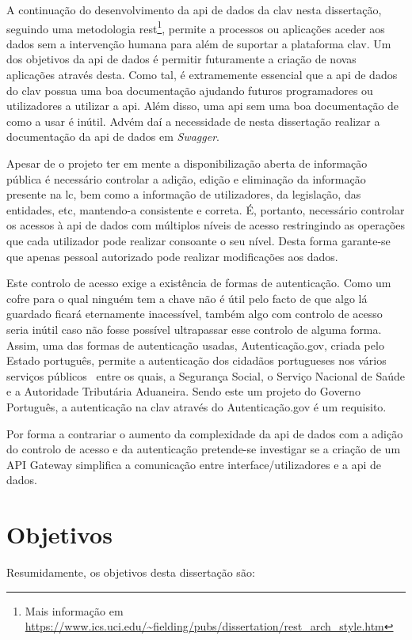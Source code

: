 A continuação do desenvolvimento da \acrshort{api} de dados da \acrshort{clav} nesta dissertação, seguindo uma metodologia \acrshort{rest}\footnote{Mais informação em \url{https://www.ics.uci.edu/~fielding/pubs/dissertation/rest_arch_style.htm}}, permite a processos ou aplicações aceder aos dados sem a intervenção humana para além de suportar a plataforma \acrshort{clav}. Um dos objetivos da \acrshort{api} de dados é permitir futuramente a criação de novas aplicações através desta. Como tal, é extramemente essencial que a \acrshort{api} de dados do \acrshort{clav} possua uma boa documentação ajudando futuros programadores ou utilizadores a utilizar a \acrshort{api}. Além disso, uma \acrshort{api} sem uma boa documentação de como a usar é inútil. Advém daí a necessidade de nesta dissertação realizar a documentação da \acrshort{api} de dados em \textit{Swagger}.

Apesar de o projeto ter em mente a disponibilização aberta de informação pública é necessário controlar a adição, edição e eliminação da informação presente na \acrlong{lc}, bem como a informação de utilizadores, da legislação, das entidades, etc, mantendo-a consistente e correta. É, portanto, necessário controlar os acessos à \acrshort{api} de dados com múltiplos níveis de acesso restringindo as operações que cada utilizador pode realizar consoante o seu nível. Desta forma garante-se que apenas pessoal autorizado pode realizar modificações aos dados.

Este controlo de acesso exige a existência de formas de autenticação. Como um cofre para o qual ninguém tem a chave não é útil pelo facto de que algo lá guardado ficará eternamente inacessível, também algo com controlo de acesso seria inútil caso não fosse possível ultrapassar esse controlo de alguma forma. Assim, uma das formas de autenticação usadas, Autenticação.gov, criada pelo Estado português, permite a autenticação dos cidadãos portugueses nos vários serviços públicos~\cite{authgov} entre os quais, a Segurança Social, o Serviço Nacional de Saúde e a Autoridade Tributária Aduaneira. Sendo este um projeto do Governo Português, a autenticação na \acrshort{clav} através do Autenticação.gov é um requisito.

Por forma a contrariar o aumento da complexidade da \acrshort{api} de dados com a adição do controlo de acesso e da autenticação pretende-se investigar se a criação de um API Gateway simplifica a comunicação entre interface/utilizadores e a \acrshort{api} de dados.

\section{Objetivos}
Resumidamente, os objetivos desta dissertação são:

